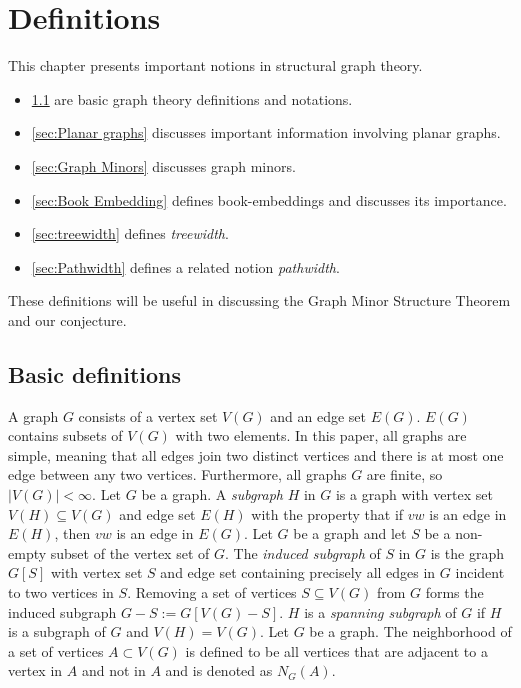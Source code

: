 \chapter{Definitions}\label{chap:Definitions}
This chapter presents important notions in structural graph theory.
\begin{itemize}
	\item \cref{sec: Basic definitions} are basic graph theory definitions and notations.
	\item \cref{sec:Planar graphs} discusses important information involving planar graphs.
	\item \cref{sec:Graph Minors} discusses graph minors.
	\item \cref{sec:Book Embedding} defines book-embeddings and discusses its importance.
	\item \cref{sec:treewidth} defines \textit{treewidth}.
	\item \cref{sec:Pathwidth} defines a related notion \textit{pathwidth}.
\end{itemize}
These definitions will be useful in discussing the Graph Minor Structure Theorem and our conjecture.
\section{Basic definitions}\label{sec: Basic definitions}
A graph $G$ consists of a vertex set $V(G)$ and an edge set $E(G)$. $E(G)$ contains subsets of $V(G)$ with two elements. In this paper, all graphs are simple, meaning that all edges join two distinct vertices and there is at most one edge between any two vertices. Furthermore, all graphs $G$ are finite, so $|V(G)| < \infty$. 
Let $G$ be a graph. A \textit{subgraph} $H$ in $G$ is a graph with vertex set $V(H) \subseteq V(G)$ and edge set $E(H)$ with the property that if $vw$ is an edge in $E(H)$, then $vw$ is an edge in $E(G)$.
Let $G$ be a graph and let $S$ be a non-empty subset of the vertex set of $G$. The \textit{induced subgraph} of $S$ in $G$ is the graph $G[S]$ with vertex set $S$ and edge set containing precisely all edges in $G$ incident to two vertices in $S$. Removing a set of vertices $S \subseteq V(G)$ from $G$ forms the induced subgraph $G - S := G[V(G) - S]$. 
$H$ is a \textit{spanning subgraph} of $G$ if $H$ is a subgraph of $G$ and $V(H) = V(G)$. 
Let $G$ be a graph. The neighborhood of a set of vertices $A \subset V(G)$ is defined to be all vertices that are adjacent to a vertex in $A$ and not in $A$ and is denoted as $N_G(A)$. 


